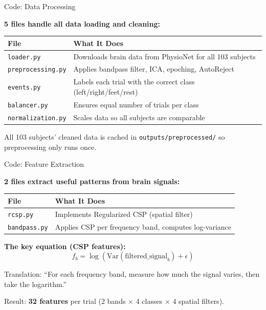 \documentclass[10pt]{beamer}
\begin{document}
\begin{frame}{Code: Data Processing}

\small
\textbf{5 files handle all data loading and cleaning:}

\vspace{4pt}
\begin{tabular}{ll}
\toprule
\textbf{File} & \textbf{What It Does} \\
\midrule
\texttt{loader.py} & Downloads brain data from PhysioNet for all 103 subjects \\
\texttt{preprocessing.py} & Applies bandpass filter, ICA, epoching, AutoReject \\
\texttt{events.py} & Labels each trial with the correct class (left/right/feet/rest) \\
\texttt{balancer.py} & Ensures equal number of trials per class \\
\texttt{normalization.py} & Scales data so all subjects are comparable \\
\bottomrule
\end{tabular}

\vspace{4pt}
All 103 subjects' cleaned data is cached in \texttt{outputs/preprocessed/} so preprocessing only runs once.

\end{frame}

\begin{frame}{Code: Feature Extraction}

\small
\textbf{2 files extract useful patterns from brain signals:}

\vspace{4pt}
\begin{tabular}{ll}
\toprule
\textbf{File} & \textbf{What It Does} \\
\midrule
\texttt{rcsp.py} & Implements Regularized CSP (spatial filter) \\
\texttt{bandpass.py} & Applies CSP per frequency band, computes log-variance \\
\bottomrule
\end{tabular}

\vspace{6pt}
\textbf{The key equation (CSP features):}
\vspace{-2pt}
\[
f_b = \log\!\left(\mathrm{Var}(\text{filtered\_signal}_b) + \epsilon\right)
\]

\vspace{-4pt}
Translation: ``For each frequency band, measure how much the signal varies, then take the logarithm.''

\vspace{4pt}
Result: \textbf{32 features} per trial (2 bands $\times$ 4 classes $\times$ 4 spatial filters).

\end{frame}
\end{document}
